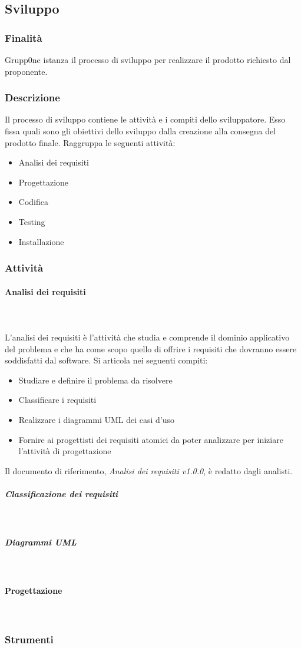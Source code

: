 \documentclass[../norme-di-progetto.tex]{subfiles}
\begin{document}
\subsection{Sviluppo}
\label{sub:sviluppo}
\subsubsection{Finalità}
\label{subs:finalità}
Grupp0ne istanza il processo di sviluppo per realizzare il prodotto richiesto dal proponente.
\subsubsection{Descrizione}
\label{subs:descrizione}
Il processo di sviluppo contiene le attività e i compiti dello sviluppatore. Esso fissa quali sono gli obiettivi dello sviluppo dalla creazione alla consegna del prodotto finale. Raggruppa le seguenti attività:
\begin{itemize}
	\item Analisi dei requisiti
	\item Progettazione
	\item Codifica
	\item Testing
	\item Installazione
\end{itemize}
\subsubsection{Attività}
\label{subs:attività}
\paragraph{Analisi dei requisiti}\mbox{}\\
\label{par:analisi dei requisiti}
\\L'analisi dei requisiti è l'attività che studia e comprende il dominio applicativo del problema e che ha come scopo quello di offrire i requisiti che dovranno essere soddisfatti dal software. Si articola nei seguenti compiti:
\begin{itemize}
	\item Studiare e definire il problema da risolvere
	\item Classificare i requisiti
	\item Realizzare i diagrammi UML dei casi d'uso
	\item Fornire ai progettisti dei requisiti atomici da poter analizzare per iniziare l'attività di progettazione
\end{itemize} 
Il documento di riferimento, \textit{Analisi dei requisiti v1.0.0}, è redatto dagli analisti.
\subparagraph{Classificazione dei requisiti}\mbox{}\\
\label{subp:classificazione dei requisiti}
\subparagraph{Diagrammi UML}\mbox{}\\
\label{subp:diagrammi UML}
\paragraph{Progettazione}\mbox{}\\
\label{par:progettazione}
\subsubsection{Strumenti}
\label{subs:strumenti}
\begin{comment}
inserire immagine di plantUML
\end{comment}
\end{document}
